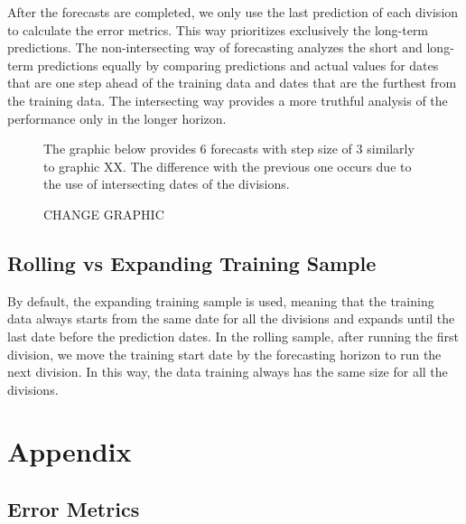 \documentclass{article}
\numberwithin{equation}{section}
\begin{document}
After the forecasts are completed, we only use the last prediction of each division to calculate the error metrics. This way prioritizes exclusively the long-term predictions. The non-intersecting way of forecasting analyzes the short and long-term predictions equally by comparing predictions and actual values for dates that are one step ahead of the training data and dates that are the furthest from the training data. The intersecting way provides a more truthful analysis of the performance only in the longer horizon.

\begin{figure}[H]
    The graphic below provides 6 forecasts with step size of 3 similarly to graphic XX. The difference with the previous one occurs due to the use of intersecting dates of the divisions.

    CHANGE GRAPHIC
    \begin{center}
    \end{center}
\end{figure}

\subsection{Rolling vs Expanding Training Sample}

By default, the expanding training sample is used, meaning that the training data always starts from the same date for all the divisions and expands until the last date before the prediction dates. In the rolling sample, after running the first division, we move the training start date by the forecasting horizon to run the next division. In this way, the data training always has the same size for all the divisions.


\newpage

\section{Appendix}

\subsection{Error Metrics}
\label{sec:error_metrics}
\end{document}
